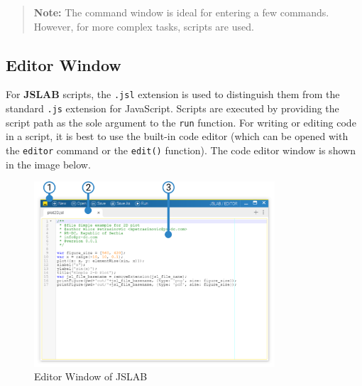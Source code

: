 \documentclass[12pt,a4paper]{article}
\begin{document}
\begin{quotation}
\textbf{Note:} The command window is ideal for entering a few commands. However, for more complex tasks, scripts are used.
\end{quotation}


\subsection{Editor Window}
\label{sec:editor-window}

For \textbf{JSLAB} scripts, the \texttt{.jsl} extension is used to distinguish them from the standard \texttt{.js} extension for JavaScript. Scripts are executed by providing the script path as the sole argument to the \texttt{run} function. For writing or editing code in a script, it is best to use the built-in code editor (which can be opened with the \texttt{editor} command or the \texttt{edit()} function). The code editor window is shown in the image below.

\begin{figure}[H]
    \centering
    \includegraphics[width=0.8\textwidth]{resources/JSLAB_editor_window.png}
    \caption{Editor Window of JSLAB}
    \label{fig:editor-window}
\end{figure}
\end{document}
